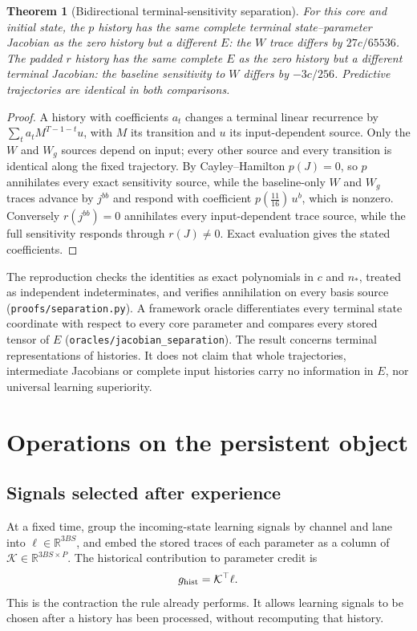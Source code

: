 \documentclass[11pt]{article}
\newtheorem{theorem}{Theorem}
\theoremstyle{definition}
\newcommand{\R}{\mathbb R}
\begin{document}
\begin{theorem}[Bidirectional terminal-sensitivity separation]
\label{thm:jacobian-separation}
For this core and initial state, the $p$ history has the same complete terminal
state--parameter Jacobian as the zero history but a different $E$: the $W$ trace
differs by $27c/65536$. The padded $r$ history has the same complete $E$ as the
zero history but a different terminal Jacobian: the baseline sensitivity to $W$
differs by $-3c/256$. Predictive trajectories are identical in both comparisons.
\end{theorem}
\begin{proof}
A history with coefficients $a_t$ changes a terminal linear recurrence by
$\sum_ta_tM^{T-1-t}u$, with $M$ its transition and $u$ its input-dependent source.
Only the $W$ and $W_g$ sources depend on input; every other source and every
transition is identical along the fixed trajectory. By Cayley--Hamilton $p(J)=0$,
so $p$ annihilates every exact sensitivity source, while the baseline-only $W$ and
$W_g$ traces advance by $j^{bb}$ and respond with coefficient $p(\tfrac{11}{16})\,
u^{b}$, which is nonzero. Conversely $r(j^{bb})=0$ annihilates every
input-dependent trace source, while the full sensitivity responds through
$r(J)\neq0$. Exact evaluation gives the stated coefficients.
\end{proof}
The reproduction checks the identities as exact polynomials in $c$ and $n_*$,
treated as independent indeterminates, and verifies annihilation on every basis
source (\texttt{proofs/separation.py}). A framework oracle differentiates every
terminal state coordinate with respect to every core parameter and compares every
stored tensor of $E$ (\texttt{oracles/jacobian\_separation}). The result concerns
terminal representations of histories. It does not claim that whole trajectories,
intermediate Jacobians or complete input histories carry no information in $E$,
nor universal learning superiority.

\section{Operations on the persistent object}
\label{sec:operator}

\subsection{Signals selected after experience}

At a fixed time, group the incoming-state learning signals by channel and lane into
$\ell\in\R^{3BS}$, and embed the stored traces of each parameter as a column of
$\mathcal K\in\R^{3BS\times P}$. The historical contribution to parameter credit is
\begin{equation}
 g_{\rm hist}=\mathcal K^\top\ell.
 \label{eq:operator-readout}
\end{equation}
This is the contraction the rule already performs. It allows learning signals to
be chosen after a history has been processed, without recomputing that history.
\end{document}
